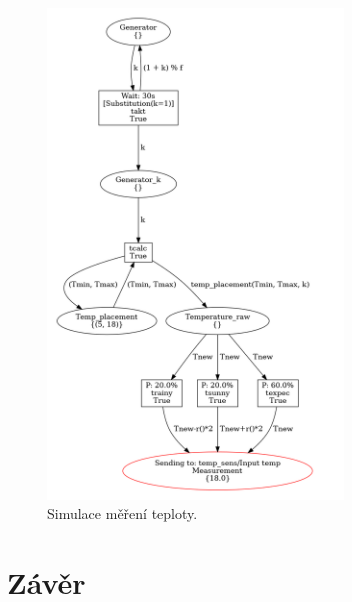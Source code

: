 \begin{figure}[htb]
  \centering
  \includegraphics[width=0.7\textwidth]{obrazky-figures/thermometr.png}
  \caption{Simulace měření teploty.}
  \label{thermometr-viz}
\end{figure}

\chapter{Závěr}
\label{zaver}
